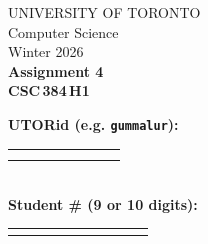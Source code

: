 \documentclass[12pt]{article}
\begin{document}
\noindent
\begin{minipage}{0.45\textwidth}
\large
\noindent  UNIVERSITY OF TORONTO\\
  Computer Science\\[1.75ex]
  Winter 2026\\[1.75ex]
  \textbf{Assignment 4} \\
  \textbf{{CSC\,384\,H1}}
\end{minipage}%
\hspace{-1cm}
\begin{minipage}{0.6\textwidth}
\raggedleft
\textbf{UTORid (e.g. \texttt{gummalur}):} \\[1ex]
\begin{tabular}{|c|c|c|c|c|c|c|c|}
  \hline
  \hspace{1.2em}\; & \hspace{1.2em}\; & \hspace{1.2em}\; & \hspace{1.2em}\; & \hspace{1.2em}\; & \hspace{1.2em}\; & \hspace{1.2em}\; & \hspace{1.2em}\; \\
  \hspace{1.2em}\; & \hspace{1.2em}\; & \hspace{1.2em}\; & \hspace{1.2em}\; & \hspace{1.2em}\; & \hspace{1.2em}\; & \hspace{1.2em}\; & \hspace{1.2em}\;\\
  \hline
\end{tabular}\\[2ex]
\textbf{Student \# (9 or 10 digits):} \\[1ex]
\begin{tabular}{|c|c|c|c|c|c|c|c|c|c|}
  \hline
  \hspace{1.2em}\; & \hspace{1.2em}\; & \hspace{1.2em}\; & \hspace{1.2em}\; & \hspace{1.2em}\; & \hspace{1.2em}\; & \hspace{1.2em}\; & \hspace{1.2em}\; & \hspace{1.2em}\; & \hspace{1.2em}\; \\

\end{tabular}
\end{minipage}
\end{document}
